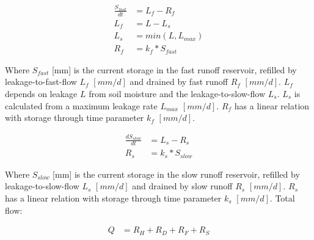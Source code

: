 \begin{align}
	\frac{S_{fast}}{dt} &= L_f - R_f\\
	L_f &= L-L_{s} \\
	L_s &= min(L,L_{max}) \\
	R_f &= k_f * S_{fast} 
\end{align}

Where $S_{fast}$ [mm] is the current storage in the fast runoff reservoir, refilled by leakage-to-fast-flow $L_f$ $[mm/d]$ and drained by fast runoff $R_f$ $[mm/d]$.
$L_f$ depends on leakage $L$ from soil moisture and the leakage-to-slow-flow $L_s$. 
$L_s$ is calculated from a maximum leakage rate $L_{max}$ $[mm/d]$.
$R_f$ has a linear relation with storage through time parameter $k_f$ $[mm/d]$.

\begin{align}
	\frac{dS_{slow}}{dt} &= L_s - R_s \\
	R_s &= k_s * S_{slow} 
\end{align}

Where $S_{slow}$ [mm] is the current storage in the slow runoff reservoir, refilled by leakage-to-slow-flow $L_s$ $[mm/d]$ and drained by slow runoff $R_s$ $[mm/d]$.
$R_s$ has a linear relation with storage through time parameter $k_s$ $[mm/d]$.
Total flow:

\begin{align}
	Q &= R_H+R_D+R_F+R_S
\end{align}

